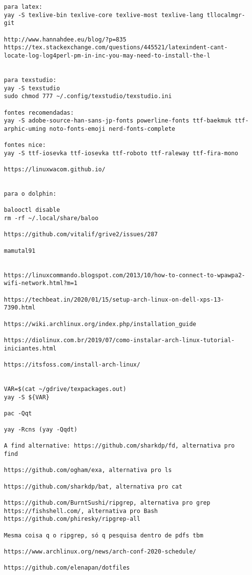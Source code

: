 \documentclass[dark, index]{Iart}
\begin{document}
\begin{lstlisting}
para latex:
yay -S texlive-bin texlive-core texlive-most texlive-lang tllocalmgr-git

http://www.hannahdee.eu/blog/?p=835
https://tex.stackexchange.com/questions/445521/latexindent-cant-locate-log-log4perl-pm-in-inc-you-may-need-to-install-the-l


para texstudio:
yay -S texstudio
sudo chmod 777 ~/.config/texstudio/texstudio.ini

fontes recomendadas:
yay -S adobe-source-han-sans-jp-fonts powerline-fonts ttf-baekmuk ttf-arphic-uming noto-fonts-emoji nerd-fonts-complete

fontes nice:
yay -S ttf-iosevka ttf-iosevka ttf-roboto ttf-raleway ttf-fira-mono

https://linuxwacom.github.io/


para o dolphin: 

balooctl disable
rm -rf ~/.local/share/baloo

https://github.com/vitalif/grive2/issues/287

mamutal91


https://linuxcommando.blogspot.com/2013/10/how-to-connect-to-wpawpa2-wifi-network.html?m=1

https://techbeat.in/2020/01/15/setup-arch-linux-on-dell-xps-13-7390.html

https://wiki.archlinux.org/index.php/installation_guide

https://diolinux.com.br/2019/07/como-instalar-arch-linux-tutorial-iniciantes.html

https://itsfoss.com/install-arch-linux/


VAR=$(cat ~/gdrive/texpackages.out)
yay -S ${VAR}

pac -Qqt

yay -Rcns (yay -Qqdt)

A find alternative: https://github.com/sharkdp/fd, alternativa pro find

https://github.com/ogham/exa, alternativa pro ls

https://github.com/sharkdp/bat, alternativa pro cat

https://github.com/BurntSushi/ripgrep, alternativa pro grep
https://fishshell.com/, alternativa pro Bash
https://github.com/phiresky/ripgrep-all

Mesma coisa q o ripgrep, só q pesquisa dentro de pdfs tbm

https://www.archlinux.org/news/arch-conf-2020-schedule/

https://github.com/elenapan/dotfiles


\end{lstlisting}
\end{document}
